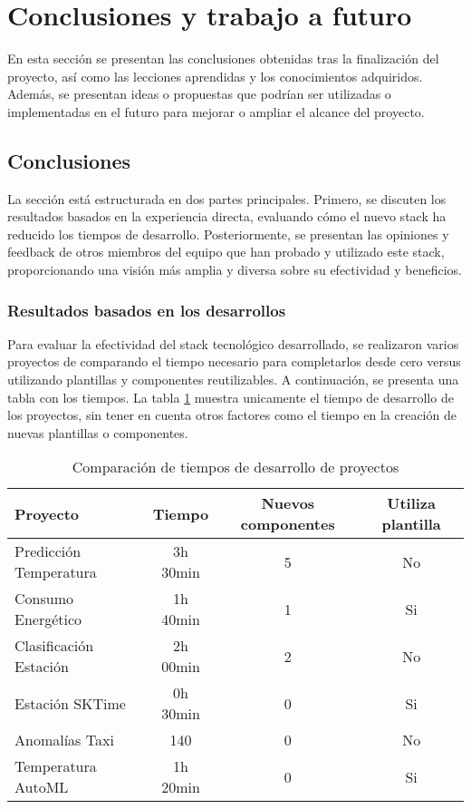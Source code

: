 \section{Conclusiones y trabajo a futuro}
En esta sección se presentan las conclusiones obtenidas tras la finalización 
del proyecto, así como las lecciones aprendidas y los conocimientos adquiridos. 
Además, se presentan ideas o propuestas que podrían ser utilizadas o implementadas 
en el futuro para mejorar o ampliar el alcance del proyecto.

\subsection{Conclusiones}
La sección está estructurada en dos partes principales. Primero, se discuten los 
resultados basados en la experiencia directa, evaluando cómo el nuevo stack ha 
reducido los tiempos de desarrollo. Posteriormente, se presentan las opiniones 
y feedback de otros miembros del equipo que han probado y utilizado este stack, 
proporcionando una visión más amplia y diversa sobre su efectividad y beneficios.

\subsubsection{Resultados basados en los desarrollos}
Para evaluar la efectividad del stack tecnológico desarrollado, se realizaron 
varios proyectos de comparando el tiempo necesario para completarlos 
desde cero versus utilizando plantillas y componentes reutilizables. A continuación, 
se presenta una tabla con los tiempos. La tabla \ref{tabla:result-time-scores} 
muestra unicamente el tiempo de desarrollo de los proyectos, sin tener en cuenta
otros factores como el tiempo en la creación de nuevas plantillas o componentes.

\begin{table}[h!]
    \centering
    \begin{tabular}{|l|c|c|c|}
    \hline
    \textbf{Proyecto} & \textbf{Tiempo} & \textbf{Nuevos componentes} & \textbf{Utiliza plantilla} \\
    \hline
    Predicción Temperatura & 3h 30min & 5 & No \\
    \hline
    Consumo Energético & 1h 40min & 1 & Si \\
    \hline
    Clasificación Estación & 2h 00min & 2 & No \\
    \hline
    Estación SKTime & 0h 30min & 0 & Si \\
    \hline
    Anomalías Taxi & 140 & 0 & No \\
    \hline
    Temperatura AutoML & 1h 20min & 0 & Si \\
    \hline
    \end{tabular}
    \caption{Comparación de tiempos de desarrollo de proyectos}
    \label{tabla:result-time-scores}
\end{table}

